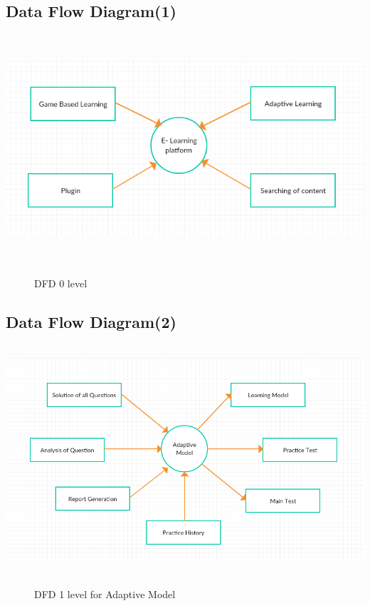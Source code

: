 \subsection{Data Flow Diagram(1)}
\begin{center}
	\includegraphics[width=13.5cm,
	height=8.5cm]{dfd0.png}
	\begin{figure}[h!]
		\centering
		\caption{DFD 0 level}%
	\end{figure}
\end{center}
\subsection{Data Flow Diagram(2)}
\begin{center}
	\includegraphics[width=13.5cm,
	height=8.5cm]{dfd1.png}
	\begin{figure}[h!]
		\centering
		\caption{DFD 1 level for Adaptive Model}%
	\end{figure}
\end{center}
